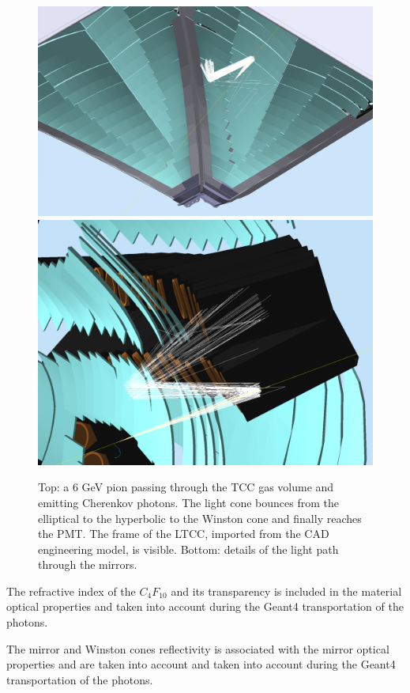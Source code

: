 \begin{figure}
	\centering
	\includegraphics[width=0.95\columnwidth,keepaspectratio]{img/ltccGeometry.png}
	\includegraphics[width=0.95\columnwidth,keepaspectratio]{img/ltccDetail.png}
	\caption{Top: a 6 GeV pion passing through the TCC gas volume and emitting Cherenkov photons. The light cone
            bounces from the elliptical to the hyperbolic to the Winston cone and finally reaches the PMT. The
            frame of the LTCC, imported from the CAD engineering model, is visible.
            Bottom: details of the light path through the mirrors. }
	\label{fig:ltccGeometry}
\end{figure}

The refractive index of the $C_4F_10$ and its transparency is included in the material optical properties and taken
into account during the Geant4 transportation of the photons.

The mirror and Winston cones reflectivity is associated with the mirror optical properties and are taken into
account and taken into account during the Geant4 transportation of the photons.

